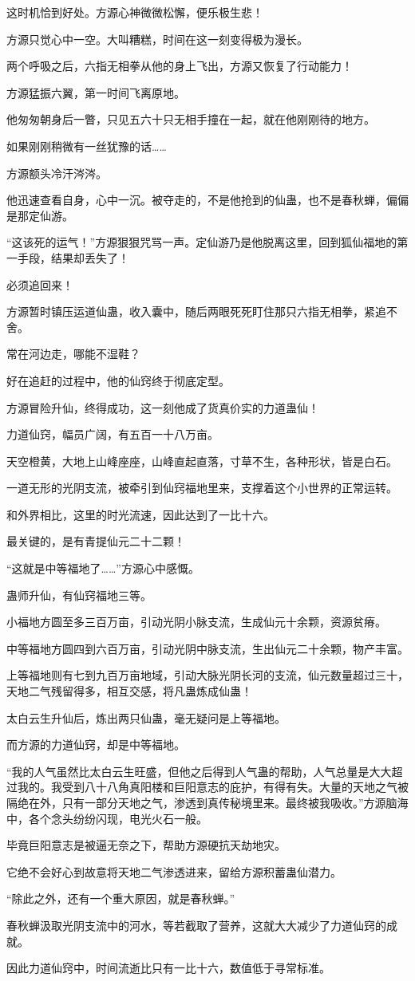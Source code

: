 \begin{this_body}
这时机恰到好处。方源心神微微松懈，便乐极生悲！

方源只觉心中一空。大叫糟糕，时间在这一刻变得极为漫长。

两个呼吸之后，六指无相拳从他的身上飞出，方源又恢复了行动能力！

方源猛振六翼，第一时间飞离原地。

他匆匆朝身后一瞥，只见五六十只无相手撞在一起，就在他刚刚待的地方。

如果刚刚稍微有一丝犹豫的话……

方源额头冷汗涔涔。

他迅速查看自身，心中一沉。被夺走的，不是他抢到的仙蛊，也不是春秋蝉，偏偏是那定仙游。

“这该死的运气！”方源狠狠咒骂一声。定仙游乃是他脱离这里，回到狐仙福地的第一手段，结果却丢失了！

必须追回来！

方源暂时镇压运道仙蛊，收入囊中，随后两眼死死盯住那只六指无相拳，紧追不舍。

常在河边走，哪能不湿鞋？

好在追赶的过程中，他的仙窍终于彻底定型。

方源冒险升仙，终得成功，这一刻他成了货真价实的力道蛊仙！

力道仙窍，幅员广阔，有五百一十八万亩。

天空橙黄，大地上山峰座座，山峰直起直落，寸草不生，各种形状，皆是白石。

一道无形的光阴支流，被牵引到仙窍福地里来，支撑着这个小世界的正常运转。

和外界相比，这里的时光流速，因此达到了一比十六。

最关键的，是有青提仙元二十二颗！

“这就是中等福地了……”方源心中感慨。

蛊师升仙，有仙窍福地三等。

小福地方圆至多三百万亩，引动光阴小脉支流，生成仙元十余颗，资源贫瘠。

中等福地方圆四到六百万亩，引动光阴中脉支流，生出仙元二十余颗，物产丰富。

上等福地则有七到九百万亩地域，引动大脉光阴长河的支流，仙元数量超过三十，天地二气残留得多，相互交感，将凡蛊炼成仙蛊！

太白云生升仙后，炼出两只仙蛊，毫无疑问是上等福地。

而方源的力道仙窍，却是中等福地。

“我的人气虽然比太白云生旺盛，但他之后得到人气蛊的帮助，人气总量是大大超过我的。我受到八十八角真阳楼和巨阳意志的庇护，有得有失。大量的天地之气被隔绝在外，只有一部分天地之气，渗透到真传秘境里来。最终被我吸收。”方源脑海中，各个念头纷纷闪现，电光火石一般。

毕竟巨阳意志是被逼无奈之下，帮助方源硬抗天劫地灾。

它绝不会好心到故意将天地二气渗透进来，留给方源积蓄蛊仙潜力。

“除此之外，还有一个重大原因，就是春秋蝉。”

春秋蝉汲取光阴支流中的河水，等若截取了营养，这就大大减少了力道仙窍的成就。

因此力道仙窍中，时间流逝比只有一比十六，数值低于寻常标准。

\end{this_body}

